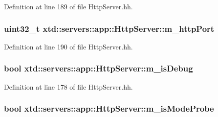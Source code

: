 Definition at line 189 of file Http\-Server.\-hh.

\hypertarget{classxtd_1_1servers_1_1app_1_1HttpServer_a75ed3bcfa895cad365f6bf0955efcf9e}{
\subsubsection[{m\-\_\-http\-Port}]{\setlength{\rightskip}{0pt plus 5cm}uint32\-\_\-t xtd\-::servers\-::app\-::\-Http\-Server\-::m\-\_\-http\-Port\hspace{0.3cm}{\ttfamily [protected]}}}\label{classxtd_1_1servers_1_1app_1_1HttpServer_a75ed3bcfa895cad365f6bf0955efcf9e}


Definition at line 190 of file Http\-Server.\-hh.

\hypertarget{classxtd_1_1servers_1_1app_1_1HttpServer_ae8b1e546b8f464e0a18c6b737ed82df8}{
\subsubsection[{m\-\_\-is\-Debug}]{\setlength{\rightskip}{0pt plus 5cm}bool xtd\-::servers\-::app\-::\-Http\-Server\-::m\-\_\-is\-Debug\hspace{0.3cm}{\ttfamily [protected]}}}\label{classxtd_1_1servers_1_1app_1_1HttpServer_ae8b1e546b8f464e0a18c6b737ed82df8}


Definition at line 178 of file Http\-Server.\-hh.

\hypertarget{classxtd_1_1servers_1_1app_1_1HttpServer_a3ae2e35fc931b303e244b01e277cb8dd}{
\subsubsection[{m\-\_\-is\-Mode\-Probe}]{\setlength{\rightskip}{0pt plus 5cm}bool xtd\-::servers\-::app\-::\-Http\-Server\-::m\-\_\-is\-Mode\-Probe\hspace{0.3cm}{\ttfamily [protected]}}}\label{classxtd_1_1servers_1_1app_1_1HttpServer_a3ae2e35fc931b303e244b01e277cb8dd}


